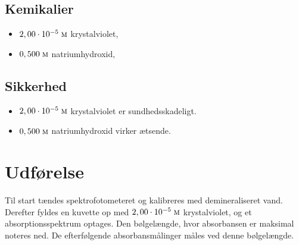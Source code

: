 \documentclass{report}
\begin{document}
\subsection*{Kemikalier}
\begin{itemize}
  \item $2,00 \cdot 10 ^{-5} \;\unit{\textsc{m}} $ krystalviolet,  
  \item $0,500 \;\unit{\textsc{m}} $ natriumhydroxid,  
\end{itemize}
\subsection*{Sikkerhed}
\begin{itemize}
  \item $2,00 \cdot 10 ^{-5} \;\unit{\textsc{m}} $ krystalviolet er sundhedsskadeligt. 
  \item $0,500 \;\unit{\textsc{m}} $ natriumhydroxid virker ætsende.
\end{itemize}
\section*{Udførelse}
Til start tændes spektrofotometeret og kalibreres med demineraliseret vand.
Derefter fyldes en kuvette op med $2,00 \cdot 10 ^{-5} \;\unit{\textsc{m}} $ krystalviolet, og et absorptionsspektrum optages. 
Den bølgelængde, hvor absorbansen er maksimal noteres ned.
De efterfølgende absorbansmålinger måles ved denne bølgelængde.
\end{document}
